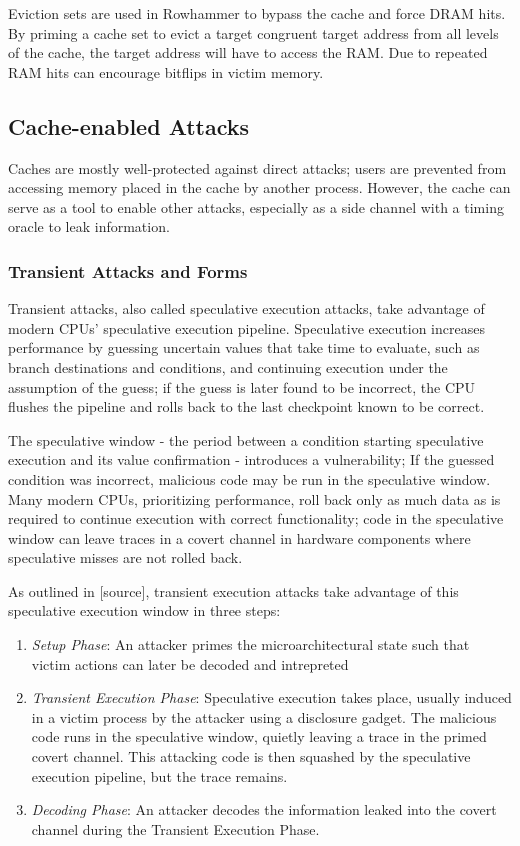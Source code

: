\documentclass[letterpaper]{article}
\begin{document}
Eviction sets are used in Rowhammer to bypass the cache and force DRAM hits.
By priming a cache set to evict a target congruent target address from all levels of the cache,
the target address will have to access the RAM.
Due to %
repeated RAM hits can encourage bitflips in victim memory.

\subsection{Cache-enabled Attacks}
Caches are mostly well-protected against direct attacks;
users are prevented from accessing memory placed in the cache by another process.
However, the cache can serve as a tool to enable other attacks,
especially as a side channel with a timing oracle to leak information.

\subsubsection{Transient Attacks and Forms}
Transient attacks, also called speculative execution attacks, take advantage of modern CPUs' speculative execution pipeline.
Speculative execution increases performance by guessing uncertain values that take time to evaluate, such as branch destinations
and conditions, and continuing execution under the assumption of the guess;
if the guess is later found to be incorrect, the CPU flushes the pipeline and rolls back to the last checkpoint known to be correct.

The speculative window - the period between a condition starting speculative execution and its value confirmation -
introduces a vulnerability;
If the guessed condition was incorrect, malicious code may be run in the speculative window.
Many modern CPUs, prioritizing performance, roll back only as much data as is required to continue execution
with correct functionality; code in the speculative window can leave traces in a covert channel in hardware
components where speculative misses are not rolled back.

As outlined in [source], transient execution attacks take advantage of this speculative execution window in three steps:
\begin{enumerate}
    \item \textit{Setup Phase}:
An attacker primes the microarchitectural state such that victim actions can later be decoded and intrepreted
    \item \textit{Transient Execution Phase}:
Speculative execution takes place, usually induced in a victim process by the attacker using a disclosure gadget.
The malicious code runs in the speculative window, quietly leaving a trace in the primed covert channel.
This attacking code is then squashed by the speculative execution pipeline, but the trace remains.
    \item \textit{Decoding Phase}:
An attacker decodes the information leaked into the covert channel during the Transient Execution Phase.
\end{enumerate}
\end{document}
